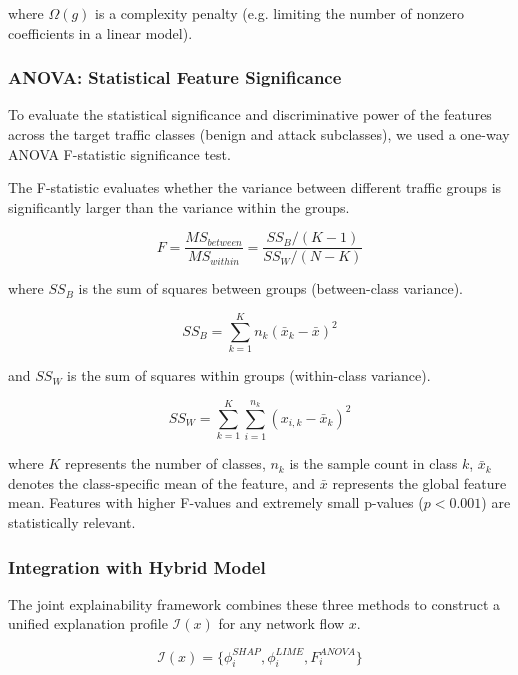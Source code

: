 \documentclass[a4paper,fleqn]{cas-sc}
\begin{document}
where $\Omega(g)$ is a complexity penalty (e.g. limiting the number of nonzero coefficients in a linear model).

\subsubsection{ANOVA: Statistical Feature Significance}

To evaluate the statistical significance and discriminative power of the features across the target traffic classes (benign and attack subclasses), we used a one-way ANOVA F-statistic significance test.

The F-statistic evaluates whether the variance between different traffic groups is significantly larger than the variance within the groups.

\begin{equation}
F = \frac{MS_{between}}{MS_{within}} = \frac{SS_B / (K - 1)}{SS_W / (N - K)}
\end{equation}

where $SS_B$ is the sum of squares between groups (between-class variance).

\begin{equation}
SS_B = \sum_{k=1}^{K} n_k (\bar{x}_k - \bar{x})^2
\end{equation}

and $SS_W$ is the sum of squares within groups (within-class variance).

\begin{equation}
SS_W = \sum_{k=1}^{K} \sum_{i=1}^{n_k} (x_{i, k} - \bar{x}_k)^2
\end{equation}

where $K$ represents the number of classes, $n_k$ is the sample count in class $k$, $\bar{x}_k$ denotes the class-specific mean of the feature, and $\bar{x}$ represents the global feature mean. Features with higher F-values and extremely small p-values ($p < 0.001$) are statistically relevant.

\subsubsection{Integration with Hybrid Model}

The joint explainability framework combines these three methods to construct a unified explanation profile $\mathcal{I}(x)$ for any network flow $x$.

\begin{equation}
\mathcal{I}(x) = \{\phi_i^{SHAP}, \phi_i^{LIME}, F_i^{ANOVA}\}
\end{equation}
\end{document}
